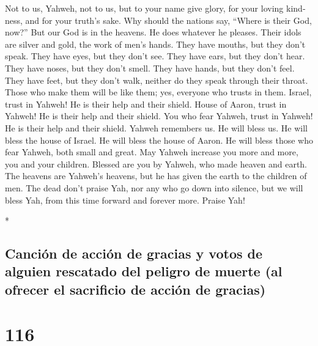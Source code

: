 \begin{paracol}{2}
\begin{otherlanguage}{english}
 Not to us, Yahweh, not to us, but to your name give
glory, for your loving kindness, and for your truth's sake.
 Why should the nations say, ``Where is their God, now?''
 But our God is in the heavens. He does whatever he
pleases.  Their idols are silver and gold, the work of
men's hands.  They have mouths, but they don't speak. They
have eyes, but they don't see.  They have ears, but they
don't hear. They have noses, but they don't smell.  They
have hands, but they don't feel. They have feet, but they don't walk,
neither do they speak through their throat.  Those who
make them will be like them; yes, everyone who trusts in them.
 Israel, trust in Yahweh! He is their help and their
shield.  House of Aaron, trust in Yahweh! He is their
help and their shield.  You who fear Yahweh, trust in
Yahweh! He is their help and their shield.  Yahweh
remembers us. He will bless us. He will bless the house of Israel. He
will bless the house of Aaron.  He will bless those who
fear Yahweh, both small and great.  May Yahweh increase
you more and more, you and your children.  Blessed are
you by Yahweh, who made heaven and earth.  The heavens
are Yahweh's heavens, but he has given the earth to the children of men.
 The dead don't praise Yah, nor any who go down into
silence,  but we will bless Yah, from this time forward
and forever more. Praise Yah!

\end{otherlanguage}

\switchcolumn[0]*

\hypertarget{canciuxf3n-de-acciuxf3n-de-gracias-y-votos-de-alguien-rescatado-del-peligro-de-muerte-al-ofrecer-el-sacrificio-de-acciuxf3n-de-gracias}{%
\subsection{Canción de acción de gracias y votos de alguien rescatado
del peligro de muerte (al ofrecer el sacrificio de acción de
gracias)}\label{canciuxf3n-de-acciuxf3n-de-gracias-y-votos-de-alguien-rescatado-del-peligro-de-muerte-al-ofrecer-el-sacrificio-de-acciuxf3n-de-gracias}}

\hypertarget{section-230}{%
\section{116}\label{section-230}}


\end{paracol}
